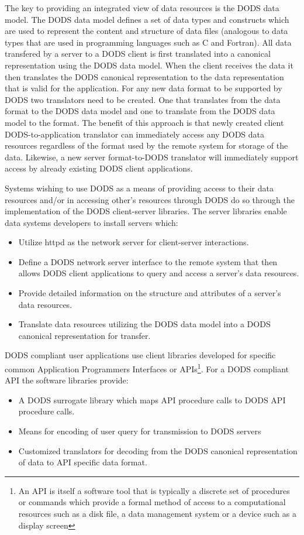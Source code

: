 The key to providing an integrated view of data resources is the DODS data
model.  The DODS data model defines a set of data types and constructs which
are used to represent the content and structure of data files (analogous to
data types that are used in programming languages such as C and Fortran).
All data transfered by a server to a DODS client is first translated into a
canonical representation using the DODS data model.  When the client receives
the data it then translates the DODS canonical representation to the data
representation that is valid for the application.  For any new data format
to be supported by DODS two translators need to be created.  One that
translates from the data format to the DODS data model and one to translate
from the DODS data model to the format.  The benefit of this approach is that
newly created client DODS-to-application translator can immediately access
any DODS data resources regardless of the format used by the remote system
for storage of the data.  Likewise, a new server format-to-DODS translator
will immediately support access by already existing DODS client applications. 


Systems wishing to use DODS as a means of providing access to their data
resources and/or in accessing other's resources through DODS do so through
the implementation of the DODS client-server libraries.  The server libraries
enable data systems developers to install servers which: 
  \begin{itemize}
    \item Utilize httpd as the network server for client-server interactions.
    \item Define a DODS network server interface to the remote system that
      then allows DODS client applications to query and access a server's data
      resources.
    \item Provide detailed information on the structure and attributes of a
      server's data resources.
    \item Translate data resources utilizing the DODS data model into a DODS
      canonical representation for transfer. 
  \end{itemize}

%

DODS compliant user applications use client libraries developed for specific
common Application Programmers Interfaces or APIs\footnote{ An API is itself
  a software tool that is typically a discrete set of procedures or commands
  which provide a formal method of access to a computational resources such
  as a disk file, a data management system or a device such as a display
  screen}.  For a DODS compliant API the software libraries provide:
  \begin{itemize}
    \item A DODS surrogate library which maps API procedure calls to DODS API
      procedure calls.
    \item Means for encoding of user query for transmission to DODS servers 
    \item Customized translators for decoding from the DODS canonical
      representation of data to API specific data format.
  \end{itemize}

